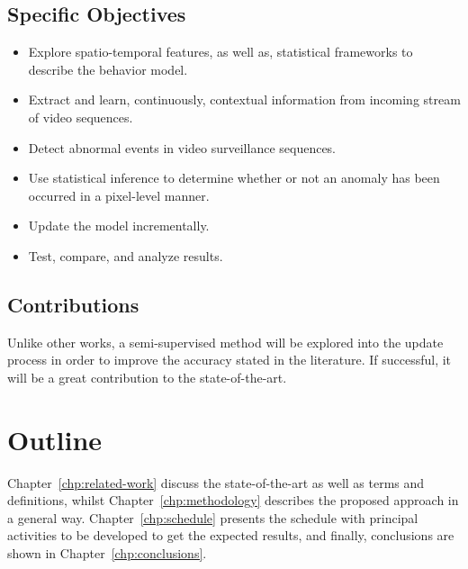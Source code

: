 \subsection{Specific Objectives}
 \begin{itemize}
  \item Explore spatio-temporal features, as well as, statistical frameworks to
describe the behavior model.
  \item Extract and learn, continuously, contextual information from incoming
stream of video sequences.
  \item Detect abnormal events in video surveillance sequences.
  \item Use statistical inference to determine whether or not an anomaly has
been occurred in a pixel-level manner.
	\item Update the model incrementally.
	\item Test, compare, and analyze results.
 \end{itemize}

 \subsection{Contributions}
 Unlike other works, a semi-supervised method will be explored into the update
process in order to improve the accuracy stated in the literature. If
successful, it will be a great contribution to the state-of-the-art. 

\section{Outline}
Chapter~\ref{chp:related-work} discuss the state-of-the-art as well as terms
and definitions, whilst Chapter~\ref{chp:methodology} 
describes the proposed approach in a general way. Chapter~\ref{chp:schedule}
presents the schedule with principal activities to be developed to get the
expected results, and finally, conclusions are shown in
Chapter~\ref{chp:conclusions}.
